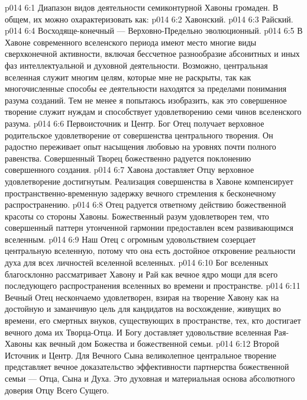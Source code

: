 \vs p014 6:1 Диапазон видов деятельности семиконтурной Хавоны громаден. В общем, их можно охарактеризовать как:
\vs p014 6:2 \bibnobreakspace Хавонский.
\vs p014 6:3 \bibnobreakspace Райский.
\vs p014 6:4 \bibnobreakspace Восходяще\hyp{}конечный --- Верховно\hyp{}Предельно эволюционный.
\vs p014 6:5 \pc В Хавоне современного вселенского периода имеют место многие виды сверхконечной активности, включая бессчетное разнообразие абсонитных и иных фаз интеллектуальной и духовной деятельности. Возможно, центральная вселенная служит многим целям, которые мне не раскрыты, так как многочисленные способы ее деятельности находятся за пределами понимания разума созданий. Тем не менее я попытаюсь изобразить, как это совершенное творение служит нуждам и способствует удовлетворению семи чинов вселенского разума.
\vs p014 6:6 \bibnobreakspace {} Первоисточник и Центр. Бог Отец получает верховное родительское удовлетворение от совершенства центрального творения. Он радостно переживает опыт насыщения любовью на уровнях почти полного равенства. Совершенный Творец божественно радуется поклонению совершенного создания.
\vs p014 6:7 Хавона доставляет Отцу верховное удовлетворение достигнутым. Реализация совершенства в Хавоне компенсирует пространственно\hyp{}временную задержку вечного стремления к бесконечному распространению.
\vs p014 6:8 Отец радуется ответному действию божественной красоты со стороны Хавоны. Божественный разум удовлетворен тем, что совершенный паттерн утонченной гармонии предоставлен всем развивающимся вселенным.
\vs p014 6:9 Наш Отец с огромным удовольствием созерцает центральную вселенную, потому что она есть достойное откровение реальности духа для всех личностей вселенной вселенных.
\vs p014 6:10 Бог вселенных благосклонно рассматривает Хавону и Рай как вечное ядро мощи для всего последующего распространения вселенных во времени и пространстве.
\vs p014 6:11 Вечный Отец нескончаемо удовлетворен, взирая на творение Хавону как на достойную и заманчивую цель для кандидатов на восхождение, живущих во времени, его смертных внуков, существующих в пространстве, тех, кто достигает вечного дома их Творца\hyp{}Отца. И Богу доставляет удовольствие вселенная Рая\hyp{}Хавоны как вечный дом Божества и божественной семьи.
\vs p014 6:12 \bibnobreakspace {} Второй Источник и Центр. Для Вечного Сына великолепное центральное творение представляет вечное доказательство эффективности партнерства божественной семьи --- Отца, Сына и Духа. Это духовная и материальная основа абсолютного доверия Отцу Всего Сущего.
